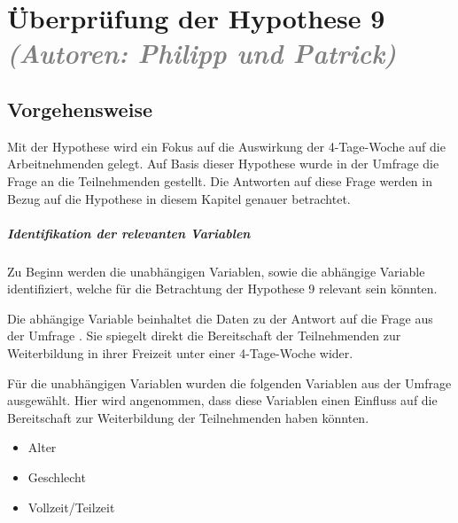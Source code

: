 
\chapter{Überprüfung der Hypothese 9 \textit{\textcolor{gray}{(Autoren: Philipp und Patrick)}}}
\label{chap:hypothese9}

\section{Vorgehensweise}
Mit der Hypothese  wird ein Fokus auf die 
Auswirkung der 4-Tage-Woche auf die Arbeitnehmenden gelegt. Auf Basis dieser Hypothese 
wurde in der Umfrage
die Frage  an die Teilnehmenden gestellt.
Die Antworten auf diese Frage werden in Bezug auf die Hypothese in diesem Kapitel genauer betrachtet.

\paragraph*{Identifikation der relevanten Variablen}

Zu Beginn werden die unabhängigen Variablen, sowie die abhängige Variable identifiziert, 
welche für die Betrachtung der Hypothese 9 relevant sein könnten.

Die abhängige Variable beinhaltet die Daten zu der Antwort auf die Frage aus der Umfrage
.
Sie spiegelt direkt die Bereitschaft der Teilnehmenden zur Weiterbildung in ihrer Freizeit 
unter einer 4-Tage-Woche wider.

Für die unabhängigen Variablen wurden die folgenden Variablen aus der Umfrage ausgewählt. 
Hier wird angenommen, dass diese Variablen einen Einfluss auf die Bereitschaft zur 
Weiterbildung der Teilnehmenden haben könnten.
\begin{itemize}
    \item Alter
    \item Geschlecht 
    \item Vollzeit/Teilzeit
\end{itemize}


